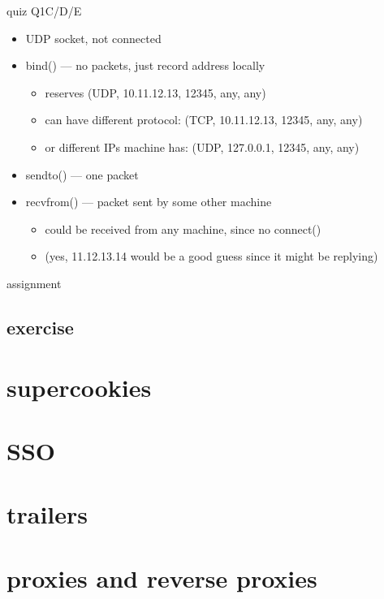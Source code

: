\begin{frame}{quiz Q1C/D/E}
    \begin{itemize}
    \item UDP socket, not connected
    \item bind() --- no packets, just record address locally
        \begin{itemize}
        \item reserves (UDP, 10.11.12.13, 12345, any, any)
        \item can have different protocol: (TCP, 10.11.12.13, 12345, any, any)
        \item or different IPs machine has: (UDP, 127.0.0.1, 12345, any, any)
        \end{itemize}
    \item sendto() --- one packet
    \item recvfrom() --- packet sent by some other machine
        \begin{itemize}
        \item could be received from any machine, since no connect()
        \item (yes, 11.12.13.14 would be a good guess since it might be replying)
        \end{itemize}
    \end{itemize}
\end{frame}

\begin{frame}{assignment}
\end{frame}

\subsection{exercise}


\section{supercookies}


\section{SSO}


\section{trailers}


\section{proxies and reverse proxies}


